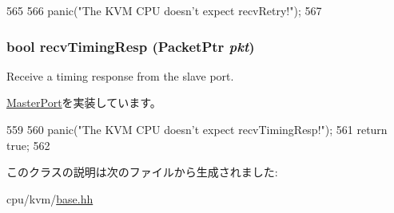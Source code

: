 \begin{DoxyCode}
565         {
566             panic("The KVM CPU doesn't expect recvRetry!\n");
567         }
\end{DoxyCode}
\hypertarget{classBaseKvmCPU_1_1KVMCpuPort_a482dba5588f4bee43e498875a61e5e0b}{
\subsubsection[{recvTimingResp}]{\setlength{\rightskip}{0pt plus 5cm}bool recvTimingResp ({\bf PacketPtr} {\em pkt})}}
\label{classBaseKvmCPU_1_1KVMCpuPort_a482dba5588f4bee43e498875a61e5e0b}
Receive a timing response from the slave port. 

\hyperlink{classMasterPort_abd323548d6c93f8b0543f1fe3a86ca35}{MasterPort}を実装しています。


\begin{DoxyCode}
559         {
560             panic("The KVM CPU doesn't expect recvTimingResp!\n");
561             return true;
562         }
\end{DoxyCode}


このクラスの説明は次のファイルから生成されました:\begin{DoxyCompactItemize}
\item 
cpu/kvm/\hyperlink{cpu_2kvm_2base_8hh}{base.hh}\end{DoxyCompactItemize}
